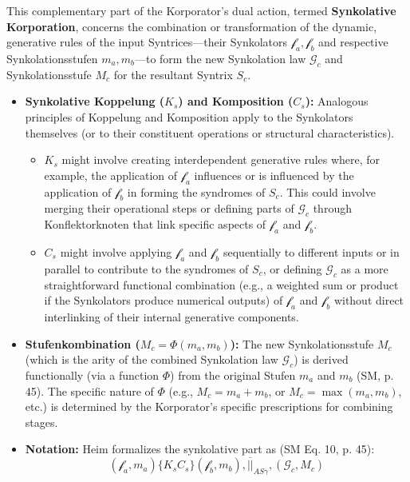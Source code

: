 \documentclass[
    12pt,              %
    a4paper,           %
    headings=normal,   %
    twoside=true,      %
    BCOR=8mm,          %
]{scrbook}
\newcommand{\synkolator}{\mathcal{f}}
\newcommand{\synkolationsstufe}{m}
\begin{document}
This complementary part of the Korporator's dual action, termed \textbf{Synkolative Korporation}, concerns the combination or transformation of the dynamic, generative rules of the input Syntrices—their Synkolators \(\synkolator_a, \synkolator_b\) and respective Synkolationsstufen \(\synkolationsstufe_a, \synkolationsstufe_b\)—to form the new Synkolation law \(\mathcal{G}_c\) and Synkolationsstufe \(M_c\) for the resultant Syntrix \(S_c\).

\begin{itemize}
    \item   \textbf{Synkolative Koppelung (\(K_s\)) and Komposition (\(C_s\)):} Analogous principles of Koppelung and Komposition apply to the Synkolators themselves (or to their constituent operations or structural characteristics).
        \begin{itemize}
            \item   \(K_s\) might involve creating interdependent generative rules where, for example, the application of \(\synkolator_a\) influences or is influenced by the application of \(\synkolator_b\) in forming the syndromes of \(S_c\). This could involve merging their operational steps or defining parts of \(\mathcal{G}_c\) through Konflektorknoten that link specific aspects of \(\synkolator_a\) and \(\synkolator_b\).
            \item   \(C_s\) might involve applying \(\synkolator_a\) and \(\synkolator_b\) sequentially to different inputs or in parallel to contribute to the syndromes of \(S_c\), or defining \(\mathcal{G}_c\) as a more straightforward functional combination (e.g., a weighted sum or product if the Synkolators produce numerical outputs) of \(\synkolator_a\) and \(\synkolator_b\) without direct interlinking of their internal generative components.
        \end{itemize}
    \item   \textbf{Stufenkombination (\(M_c = \Phi(\synkolationsstufe_a, \synkolationsstufe_b)\)):} The new Synkolationsstufe \(M_c\) (which is the arity of the combined Synkolation law \(\mathcal{G}_c\)) is derived functionally (via a function \(\Phi\)) from the original Stufen \(\synkolationsstufe_a\) and \(\synkolationsstufe_b\) (SM, p. 45). The specific nature of \(\Phi\) (e.g., \(M_c = \synkolationsstufe_a + \synkolationsstufe_b\), or \(M_c = \max(\synkolationsstufe_a, \synkolationsstufe_b)\), etc.) is determined by the Korporator's specific prescriptions for combining stages.
    \item   \textbf{Notation:} Heim formalizes the synkolative part as (SM Eq. 10, p. 45):
        \begin{equation} \label{eq:original_synkolative_korporation_revised} %
        (\synkolator_a, \synkolationsstufe_a) \{K_s C_s\} (\synkolator_b, \synkolationsstufe_b), \overline{||}_{AS\gamma}, (\mathcal{G}_c, M_c)
        \end{equation}
\end{itemize}
\end{document}
